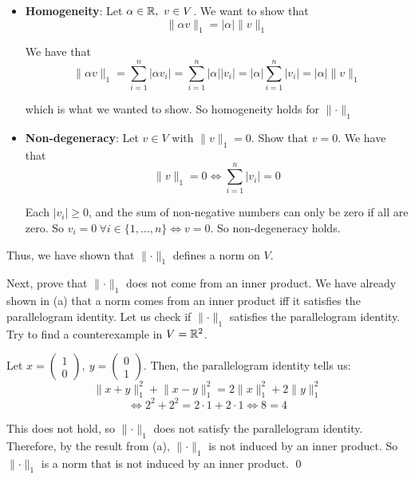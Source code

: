 \documentclass[12pt]{article}
\begin{document}
\begin{enumerate}[label=\alph*)]
\begin{itemize}
        By the standard triangle inequality on $\R$ (which we are allowed to assume), we have that
        $$
            \sum_{i = 1}^{n} |u_i + v_i| \leq \sum_{i = 1}^{n} \left(|u_i| + |v_i|\right) = \left( \sum_{i = 1}^{n} |u_i| \right) + \left( \sum_{i = 1}^{n} |v_i| \right)
        $$

        which is what we wanted to show. So the triangle inequality holds for $\lVert \cdot \rVert_1$.

        \item \textbf{Homogeneity}: Let $\alpha \in \mathbb{R},\ v \in V$. We want to show that
        $$
            \lVert \alpha v \rVert_1 = |\alpha| \lVert v \rVert_1
        $$

        We have that
        $$
            \lVert \alpha v \rVert_1 = \sum_{i = 1}^{n} |\alpha v_i| = \sum_{i = 1}^{n} |\alpha| |v_i| = |\alpha| \sum_{i = 1}^{n} |v_i| = |\alpha| \lVert v \rVert_1
        $$

        which is what we wanted to show. So homogeneity holds for $\lVert \cdot \rVert_1$

        \item \textbf{Non-degeneracy}: Let $v \in V$ with $\lVert v \rVert_1 = 0$. Show that $v = 0$.
        We have that
        $$
            \lVert v \rVert_1 = 0 \iff \sum_{i = 1}^{n} |v_i| = 0
        $$

        Each $|v_i| \geq 0$, and the sum of non-negative numbers can only be zero if all are zero. So $v_i = 0\ \forall i \in \{1,\dots,n\} \iff v = 0$. So non-degeneracy holds.
    \end{itemize}

    Thus, we have shown that $\lVert \cdot \rVert_1$ defines a norm on $V$.

    Next, prove that $\lVert \cdot \rVert_1$ does not come from an inner product. We have already shown in (a) that a norm comes from an inner product iff it satisfies the parallelogram identity. Let us check if $\lVert \cdot \rVert_1$ satisfies the parallelogram identity. Try to find a counterexample in $V = \mathbb{R}^2$.

    Let $x = \begin{pmatrix} 1 \\ 0 \end{pmatrix},\ y = \begin{pmatrix} 0 \\ 1 \end{pmatrix}$. Then, the parallelogram identity tells us:
    $$
        \lVert x + y \rVert_1^2 + \lVert x - y \rVert_1^2 = 2 \lVert x \rVert_1^2 + 2 \lVert y \rVert_1^2
    $$
    $$
        \iff 2^2 + 2^2 = 2 \cdot 1 + 2 \cdot 1 \iff 8 = 4
    $$

    This does not hold, so $\lVert \cdot \rVert_1$ does not satisfy the parallelogram identity. Therefore, by the result from (a), $\lVert \cdot \rVert_1$ is not induced by an inner product. So $\lVert \cdot \rVert_1$ is a norm that is not induced by an inner product. \qed
\end{enumerate}
\end{document}
